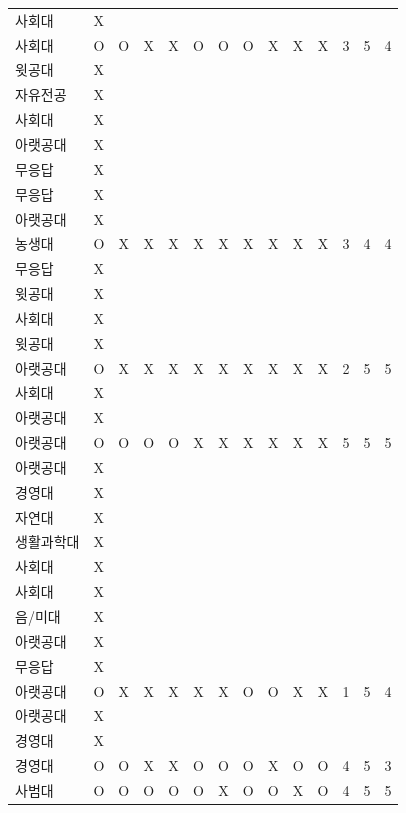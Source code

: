 \documentclass[11pt,a4paper]{article}
\begin{document}
\begin{center}
\begin{tabular}{ | p{2cm} | c | c | c | c | c | c | c | c | c | c | c | c | c | }
사회대 & X & & & & & & & & & & & & \\
사회대 & O & O & X & X & O & O & O & X & X & X & 3 & 5 & 4 \\
윗공대 & X & & & & & & & & & & & & \\
자유전공 & X & & & & & & & & & & & & \\
사회대 & X & & & & & & & & & & & & \\
아랫공대 & X & & & & & & & & & & & & \\
무응답 & X & & & & & & & & & & & & \\
무응답 & X & & & & & & & & & & & & \\
아랫공대 & X & & & & & & & & & & & & \\
농생대 & O & X & X & X & X & X & X & X & X & X & 3 & 4 & 4 \\
무응답 & X & & & & & & & & & & & & \\
윗공대 & X & & & & & & & & & & & & \\
사회대 & X & & & & & & & & & & & & \\
윗공대 & X & & & & & & & & & & & & \\
아랫공대 & O & X & X & X & X & X & X & X & X & X & 2 & 5 & 5 \\
사회대 & X & & & & & & & & & & & & \\
아랫공대 & X & & & & & & & & & & & & \\
아랫공대 & O & O & O & O & X & X & X & X & X & X & 5 & 5 & 5 \\
아랫공대 & X & & & & & & & & & & & & \\
경영대 & X & & & & & & & & & & & & \\
자연대 & X & & & & & & & & & & & & \\
생활과학대 & X & & & & & & & & & & & & \\
사회대 & X & & & & & & & & & & & & \\
사회대 & X & & & & & & & & & & & & \\
음/미대 & X & & & & & & & & & & & & \\
아랫공대 & X & & & & & & & & & & & & \\
무응답 & X & & & & & & & & & & & & \\
아랫공대 & O & X & X & X & X & X & O & O & X & X & 1 & 5 & 4 \\
아랫공대 & X & & & & & & & & & & & & \\
경영대 & X & & & & & & & & & & & & \\
경영대 & O & O & X & X & O & O & O & X & O & O & 4 & 5 & 3 \\
사범대 & O & O & O & O & O & X & O & O & X & O & 4 & 5 & 5 \\

\end{tabular}
\end{center}
\end{document}
